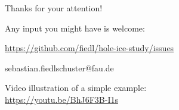 
\placelogotrue
\begin{frame}{Thanks for your attention!}
  \begin{center}
    Any input you might have is welcome: \\ \vspace{0.3cm}

    \url{https://github.com/fiedl/hole-ice-study/issues} \\ \vspace{0.1cm}

    sebastian.fiedlschuster@fau.de

    \vspace{1.5cm}

    \small{
      Video illustration of a simple example: \\
      \url{https://youtu.be/BhJ6F3B-I1s}
    }

  \end{center}
\end{frame}
\placelogofalse
